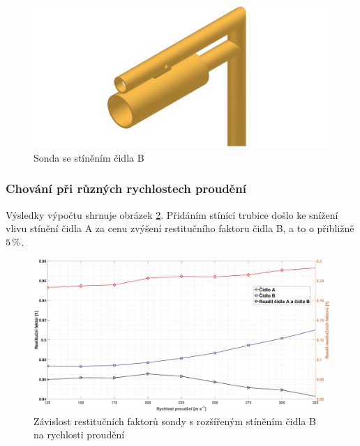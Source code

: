         \begin{figure}[ht!]
            \centering
            \includegraphics[width=\textwidth]{400_SIMULACE_KONSTRUKCNICH_UPRAV/Vykresy_rendery/Sonda_s_rozsirenym_stinenim_B.png}
            \caption{Sonda se stíněním čidla B}
            \label{fig:sonda-s-rozsirenym-stinenim-B}
        \end{figure}
        
        \subsubsection{Chování při různých rychlostech proudění}
            Výsledky výpočtu shrnuje obrázek \ref{fig:sonda-s-rosirenym-stinenim-rychlosti}. Přidáním stínící trubice došlo ke snížení vlivu stínění čidla A za cenu zvýšení restitučního faktoru čidla B, a to o přibližně $5 \, \%$.
            
            \begin{figure}[ht!]
                \centering
                \includegraphics*[width=\textwidth]{400_SIMULACE_KONSTRUKCNICH_UPRAV/Grafy/03_rychlosti.eps}
                \caption{Závislost restitučních faktorů sondy s rozšířeným stíněním čidla B na rychlosti proudění}
                \label{fig:sonda-s-rosirenym-stinenim-rychlosti}
            \end{figure}

